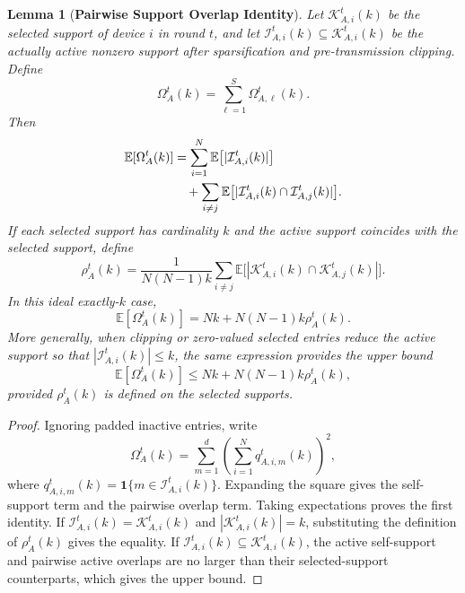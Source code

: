 \documentclass[conference]{IEEEtran}
\newtheorem{lemma}{Lemma}
\begin{document}
\begin{lemma}[\bf Pairwise Support Overlap Identity]
    \label{lemma:overlap}
    Let $\mathcal{K}_{A,i}^t(k)$ be the selected support of device $i$ in round $t$, and let $\mathcal{I}_{A,i}^t(k)\subseteq\mathcal{K}_{A,i}^t(k)$ be the actually active nonzero support after sparsification and pre-transmission clipping. Define
    \begin{equation}
        \Omega_A^t(k)=\sum_{\ell=1}^{S}\Omega_{A,\ell}^t(k).
    \end{equation}
    Then
    \begin{align}
        \mathbb{E}[\Omega_A^t(k)]
        &=\sum_{i=1}^{N}\mathbb{E}\big[|\mathcal{I}_{A,i}^t(k)|\big]
        \notag\\
        &\quad+
        \sum_{i\neq j}\mathbb{E}\big[|\mathcal{I}_{A,i}^t(k)\cap\mathcal{I}_{A,j}^t(k)|\big].
    \end{align}
    If each selected support has cardinality $k$ and the active support coincides with the selected support, define
    \begin{equation}
        \rho_A^t(k)
        =\frac{1}{N(N-1)k}
        \sum_{i\neq j}\mathbb{E}\big[|\mathcal{K}_{A,i}^t(k)\cap\mathcal{K}_{A,j}^t(k)|\big].
    \end{equation}
    In this ideal exactly-$k$ case,
    \begin{equation}
        \mathbb{E}[\Omega_A^t(k)]
        =Nk+N(N-1)k\rho_A^t(k).
    \end{equation}
    More generally, when clipping or zero-valued selected entries reduce the active support so that $|\mathcal{I}_{A,i}^t(k)|\le k$, the same expression provides the upper bound
    \begin{equation}
        \mathbb{E}[\Omega_A^t(k)]
        \le Nk+N(N-1)k\rho_A^t(k),
    \end{equation}
    provided $\rho_A^t(k)$ is defined on the selected supports.
\end{lemma}
\begin{proof}
    Ignoring padded inactive entries, write
    \begin{equation}
        \Omega_A^t(k)=\sum_{m=1}^{d}\left(\sum_{i=1}^{N}q_{A,i,m}^t(k)\right)^2,
    \end{equation}
    where $q_{A,i,m}^t(k)=\mathbf{1}\{m\in\mathcal{I}_{A,i}^t(k)\}$. Expanding the square gives the self-support term and the pairwise overlap term. Taking expectations proves the first identity. If $\mathcal{I}_{A,i}^t(k)=\mathcal{K}_{A,i}^t(k)$ and $|\mathcal{K}_{A,i}^t(k)|=k$, substituting the definition of $\rho_A^t(k)$ gives the equality. If $\mathcal{I}_{A,i}^t(k)\subseteq\mathcal{K}_{A,i}^t(k)$, the active self-support and pairwise active overlaps are no larger than their selected-support counterparts, which gives the upper bound.
\end{proof}
\end{document}
